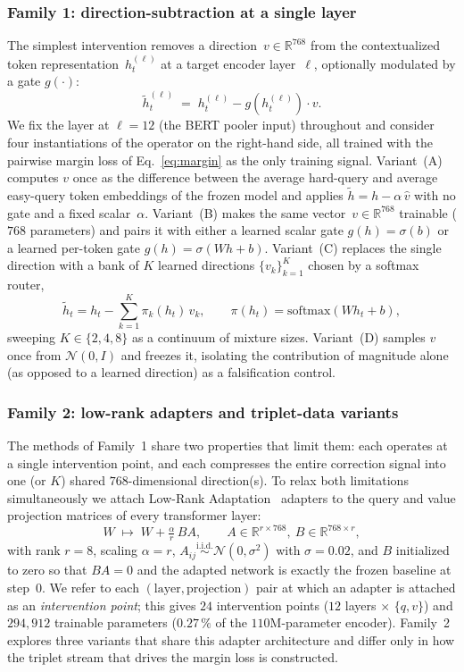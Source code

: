 \subsubsection*{Family 1: direction-subtraction at a single layer}
The simplest intervention removes a direction~$v \in \mathbb{R}^{768}$ from the contextualized token representation~$h_t^{(\ell)}$ at a target encoder layer~$\ell$, optionally modulated by a gate $g(\cdot)$:
\begin{equation}
\tilde h_t^{(\ell)} \;=\; h_t^{(\ell)} - g(h_t^{(\ell)})\cdot v.
\label{eq:single-direction}
\end{equation}
We fix the layer at $\ell=12$ (the BERT pooler input) throughout and consider four instantiations of the operator on the right-hand side, all trained with the pairwise margin loss of Eq.~\eqref{eq:margin} as the only training signal.
Variant~(A) computes $v$ once as the difference between the average hard-query and average easy-query token embeddings of the frozen model and applies $\tilde h = h - \alpha\,\hat v$ with no gate and a fixed scalar~$\alpha$.
Variant~(B) makes the same vector~$v\!\in\!\mathbb{R}^{768}$ trainable ($768$ parameters) and pairs it with either a learned scalar gate $g(h)=\sigma(b)$ or a learned per-token gate $g(h)=\sigma(W h + b)$.
Variant~(C) replaces the single direction with a bank of $K$ learned directions $\{v_k\}_{k=1}^{K}$ chosen by a softmax router,
\[
\tilde h_t = h_t - \sum_{k=1}^{K} \pi_k(h_t)\,v_k,\qquad \pi(h_t) = \mathrm{softmax}(W h_t + b),
\]
sweeping $K \in \{2, 4, 8\}$ as a continuum of mixture sizes.
Variant~(D) samples $v$ once from $\mathcal{N}(0, I)$ and freezes it, isolating the contribution of magnitude alone (as opposed to a learned direction) as a falsification control.

\subsubsection*{Family 2: low-rank adapters and triplet-data variants}
The methods of Family~1 share two properties that limit them: each operates at a single intervention point, and each compresses the entire correction signal into one (or $K$) shared $768$-dimensional direction(s). To relax both limitations simultaneously we attach Low-Rank Adaptation~\cite{hu2021lora} adapters to the query and value projection matrices of every transformer layer:
\begin{equation}
W \;\mapsto\; W + \tfrac{\alpha}{r}\,B A,\qquad A \in \mathbb{R}^{r\times 768},\ B \in \mathbb{R}^{768\times r},
\label{eq:lora}
\end{equation}
with rank $r{=}8$, scaling $\alpha{=}r$, $A_{ij} \stackrel{\text{i.i.d.}}{\sim} \mathcal{N}(0, \sigma^{2})$ with $\sigma = 0.02$, and $B$ initialized to zero so that $BA = 0$ and the adapted network is exactly the frozen baseline at step~$0$. We refer to each $(\text{layer}, \text{projection})$ pair at which an adapter is attached as an \emph{intervention point}; this gives $24$ intervention points ($12$ layers $\times$ $\{q, v\}$) and $294{,}912$ trainable parameters ($0.27\,\%$ of the $110$M-parameter encoder). Family~2 explores three variants that share this adapter architecture and differ only in how the triplet stream that drives the margin loss is constructed.

